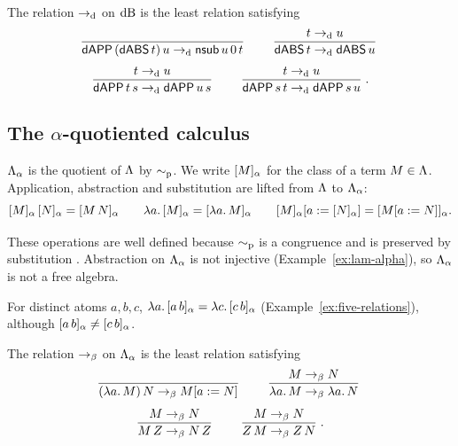 \begin{definition}
\label{def:db-beta}
The relation $\to_{\mathrm{d}}$ on $\mathrm{dB}$ is the least relation satisfying
\begin{gather*}
  \dfrac{}{\mathsf{dAPP}\, (\mathsf{dABS}\, t)\, u \to_{\mathrm{d}} \mathsf{nsub}\, u\, 0\, t}\;\textsc{}
  \qquad
  \dfrac{t \to_{\mathrm{d}} u}{\mathsf{dABS}\, t \to_{\mathrm{d}} \mathsf{dABS}\, u}\;\textsc{}
  \\[1ex]
  \dfrac{t \to_{\mathrm{d}} u}{\mathsf{dAPP}\, t\, s \to_{\mathrm{d}} \mathsf{dAPP}\, u\, s}\;\textsc{}
  \qquad
  \dfrac{t \to_{\mathrm{d}} u}{\mathsf{dAPP}\, s\, t \to_{\mathrm{d}} \mathsf{dAPP}\, s\, u}\;\textsc{}.
\end{gather*}
\end{definition}

\subsection{The \texorpdfstring{$\alpha$}{α}-quotiented calculus}
\label{subsec:lam-alpha}

\begin{definition}
\label{def:lam-alpha}
$\Lambda_{\alpha}$ is the quotient of $\Lambda$ by $\sim_{\mathrm{p}}$. We write $[M]_{\alpha}$ for
the class of a term $M \in \Lambda$. Application, abstraction and
substitution
are lifted from $\Lambda$ to $\Lambda_{\alpha}$:
\[
  [M]_{\alpha}\, [N]_{\alpha} = [M\, N]_{\alpha}
  \qquad
  \lambda a.\,[M]_{\alpha} = [\lambda a.\,M]_{\alpha}
  \qquad
  [M]_{\alpha}[a \mathrel{{:}{=}} [N]_{\alpha}] = [M[a \mathrel{{:}{=}} N]]_{\alpha}.
\]
\end{definition}

These operations are well defined because $\sim_{\mathrm{p}}$ is a congruence and
is preserved by substitution
.
Abstraction on $\Lambda_{\alpha}$ is not injective
(Example~\ref{ex:lam-alpha}), so $\Lambda_{\alpha}$ is not a free algebra.

\begin{example}
\label{ex:lam-alpha}
For distinct atoms $a, b, c$,
$\lambda a.\,[a\,b]_{\alpha} = \lambda c.\,[c\,b]_{\alpha}$
(Example~\ref{ex:five-relations}), although
$[a\,b]_{\alpha} \neq [c\,b]_{\alpha}$.
\end{example}

\begin{definition}
\label{def:beta-alpha}
The relation $\to_{\beta}$ on $\Lambda_{\alpha}$ is the least relation satisfying
\begin{gather*}
  \dfrac{}{(\lambda a.\,M)\, N \to_{\beta} M[a \mathrel{{:}{=}} N]}\;\textsc{}
  \qquad
  \dfrac{M \to_{\beta} N}{\lambda a.\,M \to_{\beta} \lambda a.\,N}\;\textsc{}
  \\[1ex]
  \dfrac{M \to_{\beta} N}{M\, Z \to_{\beta} N\, Z}\;\textsc{}
  \qquad
  \dfrac{M \to_{\beta} N}{Z\, M \to_{\beta} Z\, N}\;\textsc{}.
\end{gather*}
\end{definition}

